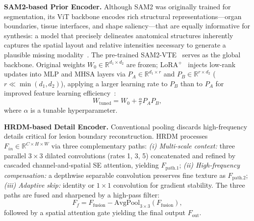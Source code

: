 \documentclass[runningheads]{llncs}
\begin{document}
\noindent\textbf{SAM2-based Prior Encoder.}
Although SAM2 was originally trained for segmentation, its
ViT backbone encodes rich structural representations---organ
boundaries, tissue interfaces, and shape saliency---that are
equally informative for synthesis: a model that precisely
delineates anatomical structures inherently captures the
spatial layout and relative intensities necessary to generate
a plausible missing modality~\cite{huo2024sami2i}.
The pre-trained SAM2-VTE~\cite{ravi2024sam2} serves as the global
backbone. Original weights $W_0\!\in\!\mathbb{R}^{d_1\times d_2}$ are
frozen; LoRA$^{+}$~\cite{hayou2024lora} injects low-rank updates into
MLP and MHSA layers via $P_A\!\in\!\mathbb{R}^{d_1\times r}$ and
$P_B\!\in\!\mathbb{R}^{r\times d_2}$ ($r\!\ll\!\min(d_1,d_2)$),
applying a larger learning rate to $P_B$ than to $P_A$ for improved
feature learning efficiency~\cite{hayou2024lora}:
\begin{equation}
  W_{\text{tuned}} = W_0 + \tfrac{\alpha}{r}P_A P_B,
  \label{eq:lora}
\end{equation}
where $\alpha$ is a tunable hyperparameter. 

\noindent\textbf{HRDM-based Detail Encoder.}
Conventional pooling discards high-frequency details critical for
lesion boundary reconstruction. HRDM processes
$F_{in}\!\in\!\mathbb{R}^{C\times H\times W}$ via three complementary
paths: \emph{(i) Multi-scale context:} three parallel $3{\times}3$
dilated convolutions (rates 1, 3, 5) concatenated and refined by
cascaded channel-and-spatial SE attention, yielding $F_{\text{path.1}}$;
\emph{(ii) High-frequency compensation:} a depthwise separable
convolution preserves fine texture as $F_{\text{path.2}}$;
\emph{(iii) Adaptive skip:} identity or $1{\times}1$ convolution
for gradient stability.
The three paths are fused and sharpened by a high-pass filter:
\begin{equation}
  F_f = F_{\text{fusion}} - \mathrm{AvgPool}_{3\times3}(F_{\text{fusion}}),
  \label{eq:hpf}
\end{equation}
followed by a spatial attention gate yielding the final output
$F_{\text{out}}$.
\end{document}
